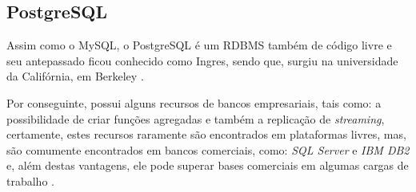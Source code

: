 \subsection{PostgreSQL}

Assim como o \acs{MySQL}, o \acs{PostgreSQL} é um \acs{RDBMS} também de
código livre e seu antepassado ficou conhecido como Ingres, sendo que, surgiu na
universidade da Califórnia, em Berkeley
\cite{postgreSQLIntroductionAndConcepts}.

Por conseguinte, possui alguns recursos de bancos empresariais, tais como: a
possibilidade de criar funções agregadas e também a replicação de
\textit{streaming},  certamente, estes recursos raramente são encontrados em 
plataformas livres, mas, são comumente encontrados em bancos comerciais, como:
\textit{SQL Server} e \textit{IBM DB2} e, além destas vantagens, ele pode 
superar bases comerciais  em algumas cargas de trabalho 
\cite{postgreSQLUpAndRunning}.
